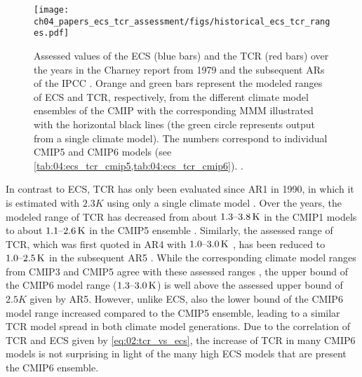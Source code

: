 \begin{figure}[t]
  \centering
  \texttt{[image: 
    ch04\_papers\_ecs\_tcr\_assessment/figs/historical\_ecs\_tcr\_ranges.pdf]}
  \caption[
    Historical values of the \acf{ECS} and the \acf{TCR} for different
    \aclp{AR} and climate model ensembles.
  ]{
    Assessed values of the \acf{ECS} (blue bars) and the \acf{TCR} (red bars)
    over the years in the Charney report from 1979 \autocite{Charney1979} and
    the subsequent \acfp{AR} of the \acf{IPCC} \autocite{Mitchell1990,
      Kattenberg1996, Albritton2001, Solomon2007, Stocker2013}. Orange and
    green bars represent the modeled ranges of \acs{ECS} and \acs{TCR},
    respectively, from the different climate model ensembles of the \acf{CMIP}
    with the corresponding \acf{MMM} illustrated with the horizontal black
    lines (the green circle represents output from a single climate model). The
    numbers correspond to individual \acs{CMIP}5 and \acs{CMIP}6 models (see
    \cref{tab:04:ecs_tcr_cmip5,tab:04:ecs_tcr_cmip6}). .
  }
  \label{fig:04:historical_ecs_tcr_ranges}
\end{figure}

In contrast to \ac{ECS}, \ac{TCR} has only been evaluated since \acs{AR}1 in
1990, in which it is estimated with $2.3 \unit{K}$ using only a single climate
model . Over the years, the modeled range
of \ac{TCR} has decreased from about $\rangeunit{1.3}{3.8}{K}$ in the
\acs{CMIP}1 models \autocite{Kattenberg1996} to about $\rangeunit{1.1}{2.6}{K}$
in the \acs{CMIP}5 ensemble \autocite{Flato2013}. Similarly, the assessed range
of \ac{TCR}, which was first quoted in \acs{AR}4 with $\rangeunit{1.0}{3.0}{K}$
\autocite{Solomon2007}, has been reduced to $\rangeunit{1.0}{2.5}{K}$ in the
subsequent \acs{AR}5 \autocite{Stocker2013}. While the corresponding climate
model ranges from \acs{CMIP}3 and \acs{CMIP}5 agree with these assessed ranges
\autocite{Randall2007, Flato2013}, the upper bound of the \acs{CMIP}6 model
range ($\rangeunit{1.3}{3.0}{K}$) is well above the assessed upper bound of
$2.5 \unit{K}$ given by \acs{AR}5. However, unlike \ac{ECS}, also the lower
bound of the \acs{CMIP}6 model range increased compared to the \acs{CMIP}5
ensemble, leading to a similar \ac{TCR} model spread in both climate model
generations. Due to the correlation of \ac{TCR} and \ac{ECS} given by
\cref{eq:02:tcr_vs_ecs}, the increase of \ac{TCR} in many \acs{CMIP}6 models is
not surprising in light of the many high \ac{ECS} models that are present the
\acs{CMIP}6 ensemble.


